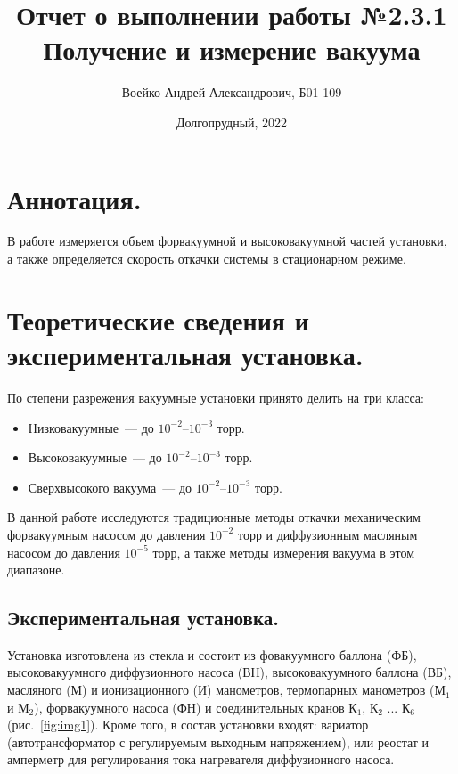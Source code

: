 \documentclass[a4paper,11pt]{article}
\title{Отчет о выполнении работы №2.3.1\\Получение и измерение вакуума}
\author{Воейко Андрей Александрович, Б01-109}
\date{Долгопрудный, 2022}
\begin{document}
\maketitle
\newpage
\section{Аннотация.}
В работе измеряется объем форвакуумной и высоковакуумной частей установки, а также определяется скорость откачки системы в стационарном режиме.
\section{Теоретические сведения и экспериментальная установка.}
По степени разрежения вакуумные установки принято делить на три класса:
\begin{itemize}
        \item Низковакуумные~--- до $10^{-2}$--$10^{-3}$ торр.
        \item Высоковакуумные~--- до $10^{-2}$--$10^{-3}$ торр.
        \item Сверхвысокого вакуума~--- до $10^{-2}$--$10^{-3}$ торр.
\end{itemize}
В данной работе исследуются традиционные методы откачки механическим форвакуумным насосом до давления $10^{-2}$ торр и диффузионным масляным насосом до давления $10^{-5}$ торр, а также методы измерения вакуума в этом диапазоне.
\subsection{Экспериментальная установка.}
Установка изготовлена из стекла и состоит из фовакуумного баллона (ФБ), высоковакуумного диффузионного насоса (ВН), высоковакуумного баллона (ВБ), масляного (М) и ионизационного (И) манометров, термопарных манометров (М$_{1}$ и М$_{2}$), форвакуумного насоса (ФН) и соединительных кранов К$_{1}$, К$_{2}$ ... К$_{6}$ (рис.~\ref{fig:img1}). Кроме того, в состав установки входят: вариатор (автотрансформатор с регулируемым выходным напряжением), или реостат и амперметр для регулирования тока нагревателя диффузионного насоса.
\end{document}
